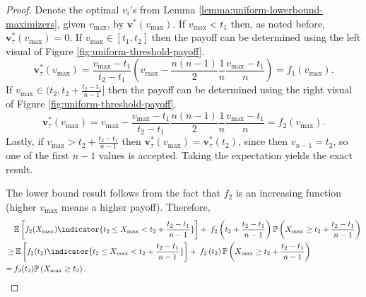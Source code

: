 \documentclass[11pt,a4paper]{article}
\numberwithin{equation}{section}
\begin{document}
\begin{proof}
    Denote the optimal $v_i$'s from Lemma \ref{lemma:uniform-lowerbound-maximizers}, given $v_{\max}$, by $\boldsymbol{v}^*(v_{\max})$. 
    If $v_{\max}<t_1$ then, as noted before, $\boldsymbol{v}_{\tau}^*(v_{\max})=0$. If $v_{\max}\in[t_1,t_2]$ then the payoff can be determined using the left visual of Figure \ref{fig:uniform-threshold-payoff}.
    $$
    \boldsymbol{v}_{\tau}^*(v_{\max})=\frac{v_{\max}-t_1}{t_2-t_1}\left(v_{\max}-\frac{n(n-1)}{2}\frac{1}{n}\frac{v_{\max}-t_1}{n}\right)=f_1(v_{\max}).
    $$
    If $v_{\max}\in(t_2,t_2+\frac{t_2-t_1}{n-1}]$ then the payoff can be determined using the right visual of Figure \ref{fig:uniform-threshold-payoff}.
    $$
    \boldsymbol{v}_{\tau}^*(v_{\max})=v_{\max}-\frac{v_{\max}-t_1}{t_2-t_1}\frac{n(n-1)}{2}\frac{1}{n}\frac{v_{\max}-t_1}{n}=f_2(v_{\max}).
    $$
    Lastly, if $v_{\max}>t_2+\frac{t_2-t_1}{n-1}$ 
    then $\boldsymbol{v}_{\tau}^*(v_{\max})=\boldsymbol{v}_{\tau}^*(t_2)$, since then $v_{n-1}=t_2$, so one of the first $n-1$ values is accepted.
    Taking the expectation yields the exact result. 
    
    The lower bound result follows from the fact that $f_2$ is an increasing function (higher $v_{\max}$ means a higher payoff). Therefore, 
    \begin{align*}
        &\mathbb{E}\left[f_2(X_{\max})\indicator{t_2 \le X_{\max}< t_2+\frac{t_2-t_1}{n-1}}\right]+\:f_2\left(t_2+\frac{t_2-t_1}{n-1}\right)\mathbb{P}\left(X_{\max}\ge t_2+\frac{t_2-t_1}{n-1}\right)\\
        \ge&\: \mathbb{E}\left[f_2(t_2)\indicator{t_2 \le X_{\max}< t_2+\frac{t_2-t_1}{n-1}}\right]
        +\:f_2\left(t_2\right)\mathbb{P}\left(X_{\max}\ge t_2+\frac{t_2-t_1}{n-1}\right)\\
        =\:&f_2(t_2)\mathbb{P}\left(X_{\max}\ge t_2\right). \qedhere
    \end{align*}
\end{proof}
\end{document}
